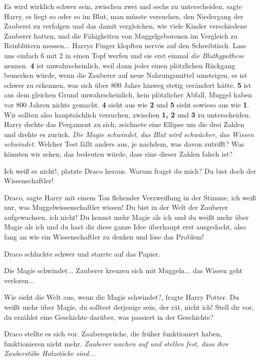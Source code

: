 \glqq{}Es wird wirklich schwer sein, zwischen zwei und sechs zu
unterscheiden\grqq{}, sagte Harry, \glqq{}es liegt so oder so im Blut, man
müsste versuchen, den Niedergang der Zauberei zu verfolgen und das damit
vergleichen, wie viele Kinder verschiedene Zauberer hatten, und die Fähigkeiten
von Muggelgeborenen im Vergleich zu Reinblütern messen...\grqq{} Harrys Finger
klopften nervös auf den Schreibtisch. \glqq{}Lass uns einfach 6 mit 2 in einen
Topf werfen und sie erst einmal \emph{die Bluthypothese} nennen. \textbf{4} ist
unwahrscheinlich, weil dann jeder einen plötzlichen Rückgang bemerken würde,
wenn die Zauberer auf neue Nahrungsmittel umsteigen, es ist schwer zu erkennen,
was sich über 800 Jahre hinweg stetig verändert hätte. \textbf{5} ist aus dem
gleichen Grund unwahrscheinlich, kein plötzlicher Abfall, Muggel haben vor 800
Jahren nichts gemacht. \textbf{4} sieht aus wie \textbf{2} und \textbf{5} sieht
sowieso aus wie \textbf{1}. Wir sollten also hauptsächlich versuchen, zwischen
\textbf{1, 2} und \textbf{3} zu unterscheiden.\grqq{} Harry drehte das Pergament
zu sich, zeichnete eine Ellipse um die drei Zahlen und drehte es zurück. \glqq{}
\emph{Die Magie schwindet}, \emph{das Blut wird schwächer,} \emph{das Wissen
schwindet.} Welcher Test fällt anders aus, je nachdem, was davon zutrifft? Was
könnten wir sehen, das bedeuten würde, dass eine dieser Zahlen falsch
ist?\grqq{}

\glqq{}Ich weiß es nicht!\grqq{}, platzte Draco heraus. \glqq{}Warum fragst du
mich? Du bist doch der Wissenschaftler!\grqq{}

\glqq{}Draco\grqq{}, sagte Harry mit einem Ton flehender Verzweiflung in der
Stimme, \glqq{}ich weiß nur, was Muggelwissenschaftler wissen! Du bist in der
Welt der Zauberer aufgewachsen, ich nicht! Du kennst mehr Magie als ich und du
weißt mehr über Magie als ich und du hast dir diese ganze Idee überhaupt erst
ausgedacht, also fang an wie ein Wissenschaftler zu denken und löse das
Problem!\grqq{}

Draco schluckte schwer und starrte auf das Papier.

Die Magie schwindet... Zauberer kreuzen sich mit Muggeln... das Wissen geht
verloren...

\glqq{}Wie sieht die Welt aus, wenn die Magie schwindet?\grqq{}, fragte Harry
Potter. \glqq{}Du weißt mehr über Magie, du solltest derjenige sein, der rät,
nicht ich! Stell dir vor, du erzählst eine Geschichte darüber, was passiert in
der Geschichte?\grqq{}

Draco stellte es sich vor. \glqq{}Zaubersprüche, die früher funktioniert haben,
funktionieren nicht mehr.\grqq{} \emph{Zauberer wachen auf und stellen fest,
dass ihre Zauberstäbe Holzstöcke sind...}

